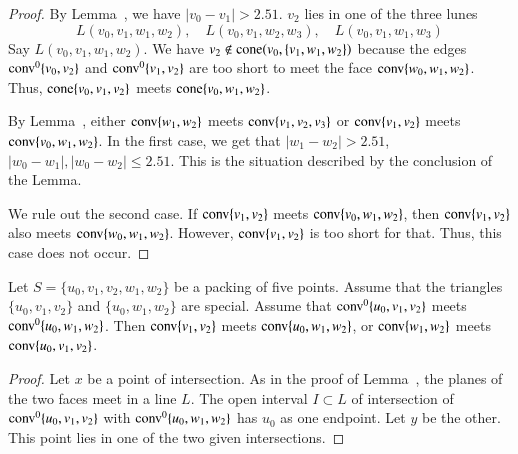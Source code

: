 \begin{tarskidata}
\begin{tarski}
\begin{proof}
By Lemma~, we have $|v_0-v_1|>2.51$.  
$v_2$ lies in one of the three lunes
$$L(v_0,v_1,w_1,w_2),\quad L(v_0,v_1,w_2,w_3),\quad L(v_0,v_1,w_1,w_3)$$
Say $L(v_0,v_1,w_1,w_2)$.   We have $v_2\not\in{\operatorname{cone}}(v_0,\{v_1,w_1,w_2\})$
because the edges ${\operatorname{conv}}^0\{v_0,v_2\}$ 
and ${\operatorname{conv}}^0\{v_1,v_2\}$ are too short to meet
the face ${\operatorname{conv}}\{w_0,w_1,w_2\}$.  Thus, ${\operatorname{cone}}\{v_0,v_1,v_2\}$ meets
${\operatorname{cone}}\{v_0,w_1,w_2\}$.

By Lemma~,
either ${\operatorname{conv}}\{w_1,w_2\}$ meets ${\operatorname{conv}}\{v_1,v_2,v_3\}$ or
${\operatorname{conv}}\{v_1,v_2\}$ meets ${\operatorname{conv}}\{v_0,w_1,w_2\}$.
In the first case, we get that $|w_1-w_2|>2.51$, $|w_0-w_1|,|w_0-w_2|\le 2.51$.
This is the situation described by the conclusion of the Lemma.

We rule out the second case.  If 
${\operatorname{conv}}\{v_1,v_2\}$ meets ${\operatorname{conv}}\{v_0,w_1,w_2\}$,
then ${\operatorname{conv}}\{v_1,v_2\}$ also meets ${\operatorname{conv}}\{w_0,w_1,w_2\}$.
However, ${\operatorname{conv}}\{v_1,v_2\}$ is too short for that.  Thus,
this case does not occur.
\end{proof}
\end{tarski}





\begin{tarski}

\begin{lemma}
Let $S=\{u_0,v_1,v_2,w_1,w_2\}$ be a packing of five points.
Assume that the triangles $\{u_0,v_1,v_2\}$ and $\{u_0,w_1,w_2\}$ are
special.
Assume that ${\operatorname{conv}}^0\{u_0,v_1,v_2\}$ meets
${\operatorname{conv}}^0\{u_0,w_1,w_2\}$.  Then
${\operatorname{conv}}\{v_1,v_2\}$ meets ${\operatorname{conv}}\{u_0,w_1,w_2\}$, or
${\operatorname{conv}}\{w_1,w_2\}$ meets ${\operatorname{conv}}\{u_0,v_1,v_2\}$.
\end{lemma}

\begin{proof}
Let $x$ be a point of intersection.  As in the proof of 
Lemma~, the planes of the two faces
meet in a line $L$.  The open interval $I\subset L$ of intersection of
${\operatorname{conv}}^0\{u_0,v_1,v_2\}$ with ${\operatorname{conv}}^0\{u_0,w_1,w_2\}$ has
$u_0$ as one endpoint.  Let $y$ be the other.  This point lies
in one of the two given intersections.
\end{proof}
\end{tarski}







\end{tarskidata}
